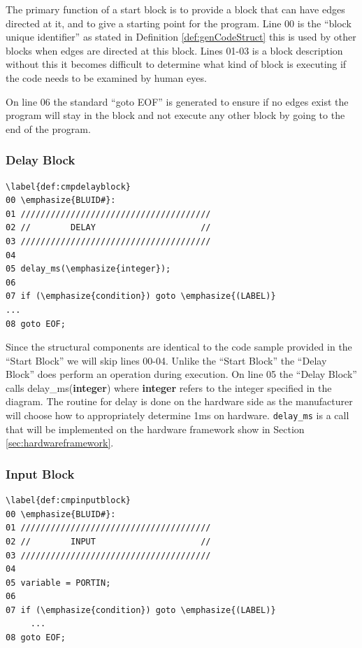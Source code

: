 The primary function of a start block is to provide a block that 
can have edges directed at it, and to give a starting point for 
the program. Line 00 is the ``block unique identifier'' as stated 
in Definition \ref{def:genCodeStruct} this is used by other blocks 
when edges are directed at this block. Lines 01-03 is a block 
description without this it becomes difficult to 
determine what kind of block is executing if the code needs to 
be examined by human eyes. 

On line 06 the standard ``goto EOF'' is generated to ensure if no 
edges exist the program will stay in the block and not execute any 
other block by going to the end of the program.

\subsubsection{Delay Block}
\begin{lstlisting}[frame=single]
\label{def:cmpdelayblock}
00 \emphasize{BLUID#}:
01 //////////////////////////////////////
02 //        DELAY                     //
03 //////////////////////////////////////
04
05 delay_ms(\emphasize{integer});
06 
07 if (\emphasize{condition}) goto \emphasize{(LABEL)}
...
08 goto EOF;
\end{lstlisting}

Since the structural components are identical to the code sample 
provided in the ``Start Block'' we will skip lines 00-04. Unlike 
the ``Start Block'' the ``Delay Block'' does perform an operation 
during execution. On line 05 the ``Delay Block'' calls 
delay\_ms(\textbf{integer}) where \textbf{integer} refers to the 
integer specified in the diagram. The routine for delay is done 
on the hardware side as the manufacturer will choose how to appropriately
determine 1ms on hardware. \texttt{delay\_ms} is a call that will
be implemented on the hardware framework show in Section \ref{sec:hardwareframework}.

\subsubsection{Input Block}
\begin{lstlisting}[frame=single]
\label{def:cmpinputblock}
00 \emphasize{BLUID#}:
01 //////////////////////////////////////
02 //        INPUT                     //
03 //////////////////////////////////////
04
05 variable = PORTIN;
06 
07 if (\emphasize{condition}) goto \emphasize{(LABEL)}
     ...
08 goto EOF;
\end{lstlisting}

